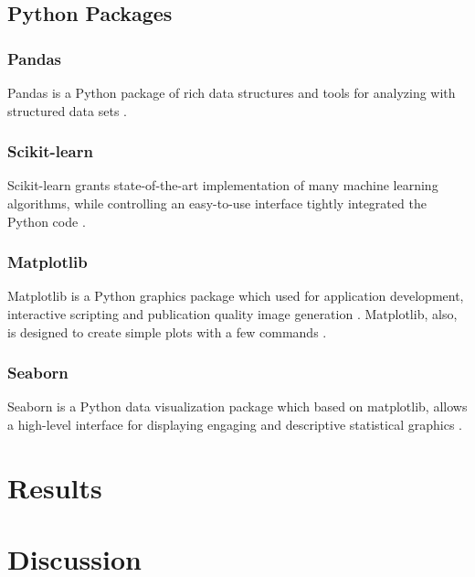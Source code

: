\documentclass[a4paper]{article}
\begin{document}
        \subsection{Python Packages}
            \subsubsection{Pandas}
                Pandas is a Python package of rich data structures and tools for analyzing with structured data sets \cite{pandas1}.

            \subsubsection{Scikit-learn}
                Scikit-learn grants state-of-the-art implementation of many machine learning algorithms, while controlling an easy-to-use interface tightly integrated the Python code \cite{sklearn1}.

            \subsubsection{Matplotlib}
                Matplotlib is a Python graphics package which used for application development, interactive scripting and publication quality image generation \cite{matplotlib2}. Matplotlib, also, is designed to create simple plots with a few commands \cite{matplotlib1}.

            \subsubsection{Seaborn}
                Seaborn is a Python data visualization package which based on matplotlib, allows a high-level interface for displaying engaging and descriptive statistical graphics \cite{seaborn1}.

    \section{Results}

    \section{Discussion}

    
    
\end{document}
